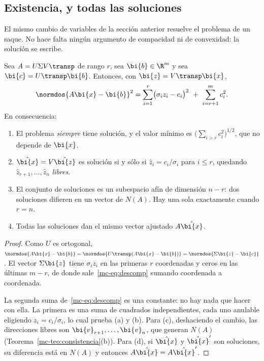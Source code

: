 \subsection{Existencia, y todas las soluciones}\label{mc-sec:existencia}

El mismo cambio de variables de la sección anterior resuelve el problema de un
saque. No hace falta ningún argumento de compacidad ni de convexidad: la
solución se escribe.

\begin{theorem}\label{mc-teo:existencia}
Sea $A=U\Sigma V\transp$ de rango $r$, sea $\bi{b}\in\R^m$ y sea
$\bi{c}=U\transp\bi{b}$. Entonces, con $\bi{z}=V\transp\bi{x}$,
\begin{equation}\label{mc-eq:descomp}
\normdos{A\bi{x}-\bi{b}}^2
=\sum_{i=1}^{r}\bigl(\sigma_iz_i-c_i\bigr)^2
\ +\ \sum_{i=r+1}^{m}c_i^2 .
\end{equation}
En consecuencia:
\begin{enumerate}[label=\textup{(\alph*)},leftmargin=*]
\item El problema \emph{siempre} tiene solución, y el valor mínimo es
$\bigl(\sum_{i>r}c_i^2\bigr)^{1/2}$, que no depende de $\bi{x}$.
\item $\hat{\bi{x}}=V\hat{\bi{z}}$ es solución si y sólo si
$\hat z_i=c_i/\sigma_i$ para $i\le r$, quedando
$\hat z_{r+1},\dots,\hat z_n$ \emph{libres}.
\item El conjunto de soluciones es un subespacio afín de dimensión $n-r$:
dos soluciones difieren en un vector de $N(A)$. Hay una sola exactamente
cuando $r=n$.
\item Todas las soluciones dan el mismo vector ajustado $A\hat{\bi{x}}$.
\end{enumerate}
\end{theorem}

\begin{proof}
Como $U$ es ortogonal, $\normdos{A\bi{x}-\bi{b}}=\normdos{U\transp(A\bi{x}-\bi{b})}
=\normdos{\Sigma\bi{z}-\bi{c}}$. El vector $\Sigma\bi{z}$ tiene
$\sigma_iz_i$ en las primeras $r$ coordenadas y ceros en las últimas $m-r$,
de donde sale~\eqref{mc-eq:descomp} sumando coordenada a coordenada.

La segunda suma de~\eqref{mc-eq:descomp} es una constante: no hay nada que
hacer con ella. La primera es una suma de cuadrados independientes, cada uno
anulable eligiendo $z_i=c_i/\sigma_i$, lo cual prueba (a) y (b). Para (c),
deshaciendo el cambio, las direcciones libres son
$\bi{v}_{r+1},\dots,\bi{v}_n$, que generan $N(A)$
(Teorema~\ref{mc-teo:consistencia}(b)). Para (d), si $\hat{\bi{x}}$ y
$\hat{\bi{x}}'$ son soluciones, su diferencia está en $N(A)$ y entonces
$A\hat{\bi{x}}=A\hat{\bi{x}}'$.
\end{proof}

